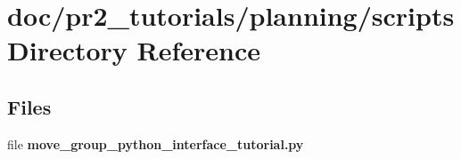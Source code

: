 \section{doc/pr2\-\_\-tutorials/planning/scripts Directory Reference}
\label{dir_16f0b5c81232d86d9ab2215039614ec9}
\subsection*{Files}
\begin{DoxyCompactItemize}
\item 
file {\bfseries move\-\_\-group\-\_\-python\-\_\-interface\-\_\-tutorial.\-py}
\end{DoxyCompactItemize}
